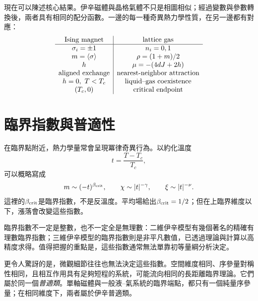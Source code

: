\begin{classroomqa}
\end{classroomqa}

現在可以陳述核心結果。伊辛磁體與晶格氣體不只是相圖相似；經過變數與參數轉換後，兩者具有相同的配分函數。一邊的每一種奇異熱力學性質，在另一邊都有對應：
\begin{equation}
\begin{array}{c|c}
\text{Ising magnet} & \text{lattice gas}\\ \hline
\sigma_i=\pm1 & n_i=0,1\\
m=\left\langle\sigma\right\rangle & \rho=(1+m)/2\\
h & \mu=-(4dJ+2h)\\
\text{aligned exchange} & \text{nearest-neighbor attraction}\\
h=0,\ T<T_c & \text{liquid--gas coexistence}\\
(T_c,0) & \text{critical endpoint}
\end{array}
\label{eq:ising-fluid-dictionary}
\end{equation}

\section{臨界指數與普適性}

在臨界點附近，熱力學量常會呈現冪律奇異行為。以約化溫度
\begin{equation}
t=\frac{T-T_c}{T_c},
\end{equation}
可以概略寫成
\begin{equation}
m\sim(-t)^{\beta_{\rm crit}},
\qquad
\chi\sim |t|^{-\gamma},
\qquad
\xi\sim |t|^{-\nu}.
\label{eq:critical-exponents}
\end{equation}
這裡的\(\beta_{\rm crit}\)是臨界指數，不是反溫度。平均場給出\(\beta_{\rm crit}=1/2\)；但在上臨界維度以下，漲落會改變這些指數。

臨界指數不一定是整數，也不一定全是無理數：二維伊辛模型有幾個著名的精確有理數臨界指數；三維伊辛模型的臨界指數則是非平凡數值，已透過理論與計算以高精度求得。值得把握的重點是，這些指數通常無法單靠初等量綱分析決定。

更令人驚訝的是，微觀細節往往也無法決定這些指數。空間維度相同、序參量對稱性相同，且相互作用具有足夠短程的系統，可能流向相同的長距離臨界理論。它們屬於同一個\emph{普適類}。單軸磁體與一般液--氣系統的臨界端點，都只有一個純量序參量；在相同維度下，兩者屬於伊辛普適類。

